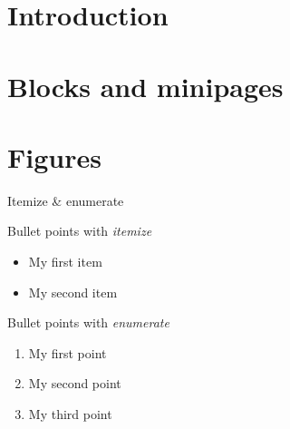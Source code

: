 \documentclass[9pt, aspectratio=169]{beamer}
\begin{document}

\section{Introduction}
\section{Blocks and minipages}
\section{Figures}

\begin{frame}{Itemize \& enumerate}
	\begin{block}{Bullet points with \textit{itemize}}
		\begin{itemize}
			\item My first item
			\item My second item
		\end{itemize}
	\end{block}
	\begin{block}{Bullet points with \textit{enumerate}}
		\begin{enumerate}
			\item My first point
			\item My second point
			\item My third point
		\end{enumerate}
	\end{block}
\end{frame}
\end{document}
